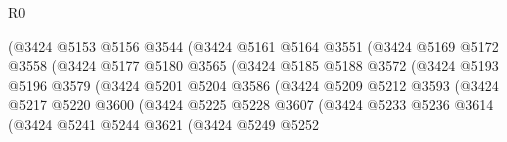 \begin{lexlean}{R0}
\begin{coremodule}
                                (@3424
                                  @5153
                                  @5156
                                  @3544
                                  (@3424
                                    @5161
                                    @5164
                                    @3551
                                    (@3424
                                      @5169
                                      @5172
                                      @3558
                                      (@3424
                                        @5177
                                        @5180
                                        @3565
                                        (@3424
                                          @5185
                                          @5188
                                          @3572
                                          (@3424
                                            @5193
                                            @5196
                                            @3579
                                            (@3424
                                              @5201
                                              @5204
                                              @3586
                                              (@3424
                                                @5209
                                                @5212
                                                @3593
                                                (@3424
                                                  @5217
                                                  @5220
                                                  @3600
                                                  (@3424
                                                    @5225
                                                    @5228
                                                    @3607
                                                    (@3424
                                                      @5233
                                                      @5236
                                                      @3614
                                                      (@3424
                                                        @5241
                                                        @5244
                                                        @3621
                                                        (@3424
                                                          @5249
                                                          @5252

\end{coremodule}
\end{lexlean}
